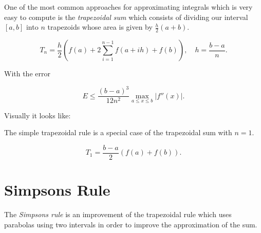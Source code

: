 One of the most common approaches for approximating integrals which is very easy to compute is the \emph{trapezoidal sum} which 
consists of dividing our interval \([a,b]\) into \(n\) trapezoids whose area is given by \(\frac{h}{2}(a + b)\). 

\[
    T_n = \frac{h}{2} \left(f(a) + 2\sum_{i = 1}^{n - 1} f(a + ih) + f(b)\right), \quad h = \frac{b - a}{n}.
\]

With the error 

\[
    E \le \frac{(b - a)^3}{12 n^2} \max_{a \le x \le b}|f''(x)|.
\]


Visually it looks like:

\newcommand{\myfunction}[2]
{
  \begin{scope}[shift={(#1,0)}]
  \draw[-latex] (-0.5,0) -- (5,0) node[below] {$x$};
  \draw[-latex] (0,-0.5) -- (0,5) node[left]  {$y$};
  \draw[thick,cyan] plot[domain=0.5:4.5,samples=41] (\x,{f(\x)});
  \node at (3.25,3.5) {$y=f(x)$};
  \foreach\i in {0,1,2,3,...,8}
  {
    \pgfmathsetmacro\j{0.5*\i+0.5}
    \coordinate (x\i) at (\j,0);
    \coordinate (y\i) at (\j,{f(\j)});
  }
  \foreach\i in {0,1,2}
    \node[below]        at (x\i) {$x_\i$};
  \node[below]          at (x7) {$x_{n-1}$};
  \node[below]          at (x8) {$x_n$};
  \node[yshift=-0.75cm] at (x0) {\strut$a$};
  \node[yshift=-0.75cm] at (x8) {\strut$b$};
  \node[yshift=-1cm]    at (x4) {(#2)};
  \end{scope}
}
\begin{center}
\end{center}

The simple trapezoidal rule is a special case of the trapezoidal sum with \(n = 1\).

\[
    T_1 = \frac{b - a}{2} (f(a) + f(b)).
\]

\section{Simpsons Rule}

The \emph{Simpsons rule} is an improvement of the trapezoidal rule which uses parabolas using two 
intervals in order to improve the approximation of the sum.

